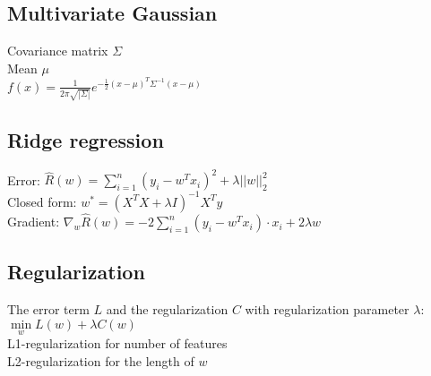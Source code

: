 \subsection*{Multivariate Gaussian}
Covariance matrix $\Sigma$ \\
Mean $\mu$ \\
$f(x) = \frac{1}{2\pi \sqrt{|\Sigma|}} e^{- \frac{1}{2} (x-\mu)^T \Sigma^{-1} (x-\mu)}$
\subsection*{Ridge regression}
Error: $\hat{R}(w) = \sum \limits_{i=1}^n (y_i - w^Tx_i)^2 + \lambda ||w||_2^2$\\
Closed form: $w^*=(X^T X + \lambda I)^{-1} X^T y$\\
Gradient: $\nabla_w \hat{R}(w) = -2 \sum \limits_{i=1}^n (y_i-w^T x_i) \cdot x_i + 2 \lambda w$

\subsection*{Regularization}
The error term $L$ and the regularization $C$ with regularization parameter $\lambda$: $\min \limits_w L(w) + \lambda C(w)$\\
L1-regularization for number of features \\
L2-regularization for the length of $w$
